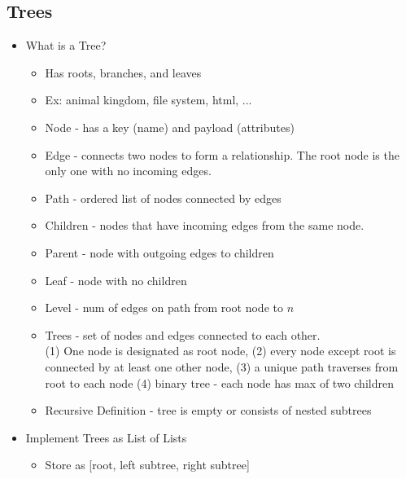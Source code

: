 \documentclass{article}
\begin{document}
\begin{multicols*}{3}
    \section{Trees}
    \renewcommand\labelitemi{{\boldmath$\cdot$}}
    \begin{itemize}[noitemsep]
        \item What is a Tree?
        \begin{itemize}
            \item Has roots, branches, and leaves
            \item Ex: animal kingdom, file system, html, ...
            \item Node - has a key (name) and payload (attributes)
            \item Edge - connects two nodes to form a relationship. The root node is 
            the only one with no incoming edges.
            \item Path - ordered list of nodes connected by edges
            \item Children - nodes that have incoming edges from the same node.
            \item Parent - node with outgoing edges to children
            \item Leaf - node with no children
            \item Level - num of edges on path from root node to $n$
            \item Trees - set of nodes and edges connected to each other. \\
            (1) One node is designated as root node, 
            (2) every node except root is connected by at least one other node,
            (3) a unique path traverses from root to each node
            (4) binary tree - each node has max of two children
            \item Recursive Definition - tree is empty or consists of nested subtrees
        \end{itemize}
        \item Implement Trees as List of Lists
        \begin{itemize}
            \item Store as [root, left subtree, right subtree]

\end{itemize}
\end{itemize}
\end{multicols*}
\end{document}
